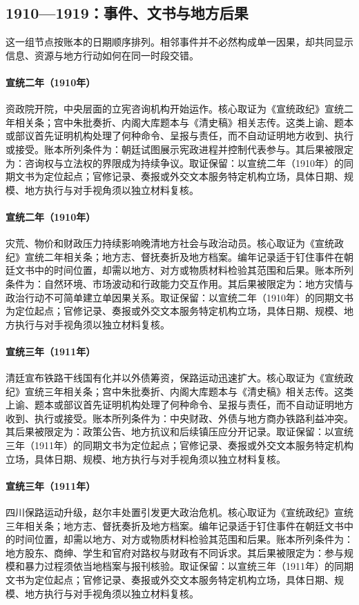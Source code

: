 \subsection{1910—1919：事件、文书与地方后果}
这一组节点按账本的日期顺序排列。相邻事件并不必然构成单一因果，却共同显示信息、资源与地方行动如何在同一时段交错。
\hypertarget{ledger:EQ-1910-ZIZHENG-YUAN}{}\paragraph{宣统二年（1910年）}资政院开院，中央层面的立宪咨询机构开始运作。核心取证为《宣统政纪》宣统二年相关条；宫中朱批奏折、内阁大库题本与《清史稿》相关志传。这类上谕、题本或部议首先证明机构处理了何种命令、呈报与责任，而不自动证明地方收到、执行或接受。账本所列条件为：朝廷试图展示宪政进程并控制代表参与。其后果被限定为：咨询权与立法权的界限成为持续争议。取证保留：以宣统二年（1910年）的同期文书为定位起点；官修记录、奏报或外交文本服务特定机构立场，具体日期、规模、地方执行与对手视角须以独立材料复核。
\hypertarget{ledger:EQ-1910-FAMINE-AND-UNREST}{}\paragraph{宣统二年（1910年）}灾荒、物价和财政压力持续影响晚清地方社会与政治动员。核心取证为《宣统政纪》宣统二年相关条；地方志、督抚奏折及地方档案。编年记录适于钉住事件在朝廷文书中的时间位置，却需以地方、对方或物质材料检验其范围和后果。账本所列条件为：自然环境、市场波动和行政能力交互作用。其后果被限定为：地方灾情与政治行动不可简单建立单因果关系。取证保留：以宣统二年（1910年）的同期文书为定位起点；官修记录、奏报或外交文本服务特定机构立场，具体日期、规模、地方执行与对手视角须以独立材料复核。
\hypertarget{ledger:EQ-1911-RAILWAY-NATIONALIZATION}{}\paragraph{宣统三年（1911年）}清廷宣布铁路干线国有化并以外债筹资，保路运动迅速扩大。核心取证为《宣统政纪》宣统三年相关条；宫中朱批奏折、内阁大库题本与《清史稿》相关志传。这类上谕、题本或部议首先证明机构处理了何种命令、呈报与责任，而不自动证明地方收到、执行或接受。账本所列条件为：中央财政、外债与地方商办铁路利益冲突。其后果被限定为：政策公告、地方抗议和后续镇压应分开记录。取证保留：以宣统三年（1911年）的同期文书为定位起点；官修记录、奏报或外交文本服务特定机构立场，具体日期、规模、地方执行与对手视角须以独立材料复核。
\hypertarget{ledger:EQ-1911-SICHUAN-RAILWAY-PROTEST}{}\paragraph{宣统三年（1911年）}四川保路运动升级，赵尔丰处置引发更大政治危机。核心取证为《宣统政纪》宣统三年相关条；地方志、督抚奏折及地方档案。编年记录适于钉住事件在朝廷文书中的时间位置，却需以地方、对方或物质材料检验其范围和后果。账本所列条件为：地方股东、商绅、学生和官府对路权与财政有不同诉求。其后果被限定为：参与规模和暴力过程须依当地档案与报刊核验。取证保留：以宣统三年（1911年）的同期文书为定位起点；官修记录、奏报或外交文本服务特定机构立场，具体日期、规模、地方执行与对手视角须以独立材料复核。
